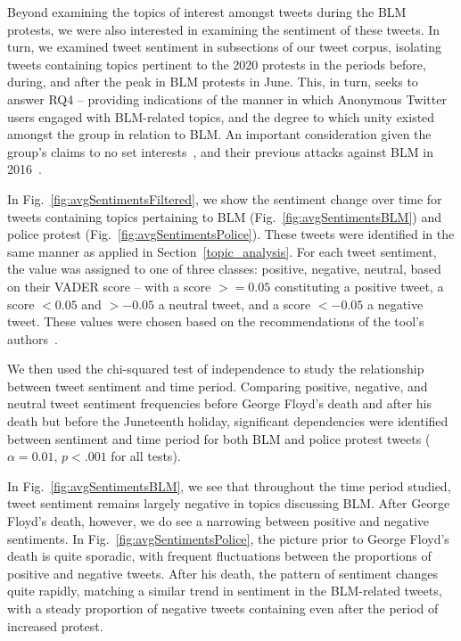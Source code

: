 \documentclass[letterpaper]{article}
\begin{document}
Beyond examining the topics of interest amongst tweets during the BLM protests, we were also interested in examining the sentiment of these tweets. In turn, we examined tweet sentiment in subsections of our tweet corpus, isolating tweets containing topics pertinent to the 2020 protests in the periods before, during, and after the peak in BLM protests in June. This, in turn, seeks to answer RQ4 -- providing indications of the manner in which Anonymous Twitter users engaged with BLM-related topics, and the degree to which unity existed amongst the group in relation to BLM. An important consideration given the group's claims to no set interests~\cite{Olson2013}, and their previous attacks against BLM in 2016~\cite{Verge2016}.

In Fig.~\ref{fig:avgSentimentsFiltered}, we show the sentiment change over time for tweets containing topics pertaining to BLM (Fig.~\ref{fig:avgSentimentsBLM}) and police protest (Fig.~\ref{fig:avgSentimentsPolice}). These tweets were identified in the same manner as applied in Section~\ref{topic_analysis}. For each tweet sentiment, the value was assigned to one of three classes: positive, negative, neutral, based on their VADER score -- with a score $>=0.05$ constituting a positive tweet, a score $<0.05$ and $>-0.05$ a neutral tweet, and a score $<-0.05$ a negative tweet. These values were chosen based on the recommendations of the tool's authors~\cite{Gilbert2014}.

We then used the chi-squared test of independence to study the relationship between tweet sentiment and time period. Comparing positive, negative, and neutral tweet sentiment frequencies before George Floyd's death and after his death but before the Juneteenth holiday, significant dependencies were identified between sentiment and time period for both BLM and police protest tweets ($\alpha=0.01$, $p<.001$ for all tests).

In Fig.~\ref{fig:avgSentimentsBLM}, we see that throughout the time period studied, tweet sentiment remains largely negative in topics discussing BLM. After George Floyd's death, however, we do see a narrowing between positive and negative sentiments. In Fig.~\ref{fig:avgSentimentsPolice}, the picture prior to George Floyd's death is quite sporadic, with frequent fluctuations between the proportions of positive and negative tweets. After his death, the pattern of sentiment changes quite rapidly, matching a similar trend in sentiment in the BLM-related tweets, with a steady proportion of negative tweets containing even after the period of increased protest.
\end{document}

